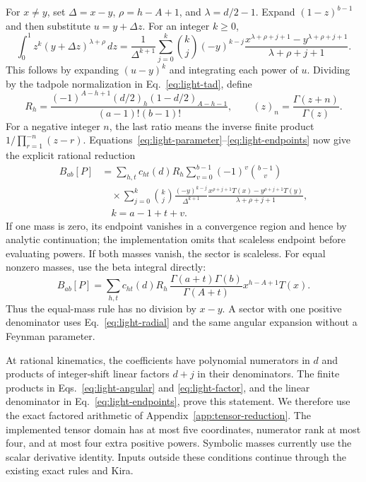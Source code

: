 For $x\ne y$, set $\Delta=x-y$, $\rho=h-A+1$, and $\lambda=d/2-1$. Expand $(1-z)^{b-1}$ and then substitute $u=y+\Delta z$. For an integer $k\ge0$,
\begin{equation}
 \int_0^1 z^k(y+\Delta z)^{\lambda+\rho}\,dz
 =\frac{1}{\Delta^{k+1}}\sum_{j=0}^k\binom{k}{j}(-y)^{k-j}
 \frac{x^{\lambda+\rho+j+1}-y^{\lambda+\rho+j+1}}{\lambda+\rho+j+1}.
 \label{eq:light-endpoints}
\end{equation}
This follows by expanding $(u-y)^k$ and integrating each power of $u$. Dividing by the tadpole normalization in Eq.~\eqref{eq:light-tad}, define
\begin{equation}
 R_h=\frac{(-1)^{A-h+1}(d/2)_h(1-d/2)_{A-h-1}}{(a-1)!(b-1)!},
 \qquad (z)_n=\frac{\Gamma(z+n)}{\Gamma(z)}.
 \label{eq:light-factor}
\end{equation}
For a negative integer $n$, the last ratio means the inverse finite product $1/\prod_{r=1}^{-n}(z-r)$. Equations~\eqref{eq:light-parameter}--\eqref{eq:light-endpoints} now give the explicit rational reduction
\begin{align}
 B_{ab}[P]&=\sum_{h,t}c_{ht}(d)R_h\sum_{v=0}^{b-1}(-1)^v\binom{b-1}{v}
 \nonumber\\ &\quad\times\sum_{j=0}^{k}\binom{k}{j}\frac{(-y)^{k-j}}{\Delta^{k+1}}
 \frac{x^{\rho+j+1}T(x)-y^{\rho+j+1}T(y)}{\lambda+\rho+j+1},\nonumber\\[-2pt]
 &\quad k=a-1+t+v.
 \label{eq:light-final}
\end{align}
If one mass is zero, its endpoint vanishes in a convergence region and hence by analytic continuation; the implementation omits that scaleless endpoint before evaluating powers. If both masses vanish, the sector is scaleless. For equal nonzero masses, use the beta integral directly:
\begin{equation}
 B_{ab}[P]=\sum_{h,t}c_{ht}(d)R_h\,
 \frac{\Gamma(a+t)\Gamma(b)}{\Gamma(A+t)}x^{h-A+1}T(x).
 \label{eq:light-equal-tensor}
\end{equation}
Thus the equal-mass rule has no division by $x-y$. A sector with one positive denominator uses Eq.~\eqref{eq:light-radial} and the same angular expansion without a Feynman parameter.

At rational kinematics, the coefficients have polynomial numerators in $d$ and products of integer-shift linear factors $d+j$ in their denominators. The finite products in Eqs.~\eqref{eq:light-angular} and \eqref{eq:light-factor}, and the linear denominator in Eq.~\eqref{eq:light-endpoints}, prove this statement. We therefore use the exact factored arithmetic of Appendix~\ref{app:tensor-reduction}. The implemented tensor domain has at most five coordinates, numerator rank at most four, and at most four extra positive powers. Symbolic masses currently use the scalar derivative identity. Inputs outside these conditions continue through the existing exact rules and Kira.
